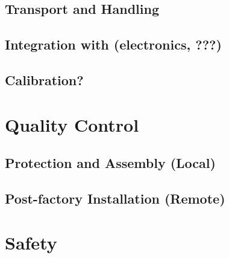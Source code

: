 \subsection{Transport and Handling}
\label{sec:fddp-crp-install-transport}


\subsection{Integration with (electronics, ???)}
\label{sec:fddp-crp-install-pd-???}


\subsection{Calibration?}
\label{sec:fddp-crp-install-calib}



\section{Quality Control}
\label{sec:fddp-crp-qc}

\subsection{Protection and Assembly (Local)}
\label{sec:fddp-crp-qc-local}


\subsection{Post-factory Installation (Remote)}
\label{sec:fddp-crp-qc-remote}





\section{Safety}
\label{sec:fddp-crp-safety}



